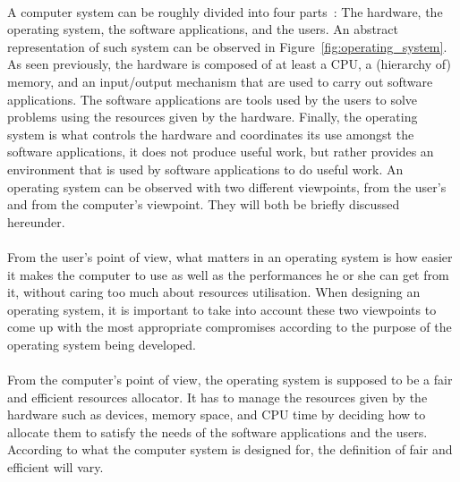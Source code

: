 \paragraph{}
A computer system can be roughly divided into four parts~\cite{Silberschatz:2012:OSC:2490781}: The hardware, the operating system, the software applications, and the users. An abstract representation of such system can be observed in Figure~\ref{fig:operating_system}. As seen previously, the hardware is composed of at least a CPU, a (hierarchy of) memory, and an input/output mechanism that are used to carry out software applications. The software applications are tools used by the users to solve problems using the resources given by the hardware. Finally, the operating system is what controls the hardware and coordinates its use amongst the software applications, it does not produce useful work, but rather provides an environment that is used by software applications to do useful work. An operating system can be observed with two different viewpoints, from the user's and from the computer's viewpoint. They will both be briefly discussed hereunder.

\paragraph{}
From the user's point of view, what matters in an operating system is how easier it makes the computer to use as well as the performances he or she can get from it, without caring too much about resources utilisation. When designing an operating system, it is important to take into account these two viewpoints to come up with the most appropriate compromises according to the purpose of the operating system being developed.

\paragraph{}
From the computer's point of view, the operating system is supposed to be a fair and efficient resources allocator. It has to manage the resources given by the hardware such as devices, memory space, and CPU time by deciding how to allocate them to satisfy the needs of the software applications and the users. According to what the computer system is designed for, the definition of fair and efficient will vary.

